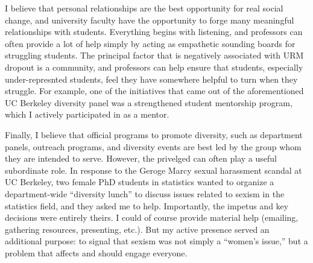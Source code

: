 I believe that personal relationships are the best opportunity for real social
change, and university faculty have the opportunity to forge many meaningful
relationships with students.  Everything begins with listening, and professors
can often provide a lot of help simply by acting as empathetic sounding boards
for struggling students.  The principal factor that is negatively associated
with URM dropout is a community, and professors can help ensure that students,
especially under-represnted students, feel they have somewhere helpful to turn
when they struggle.  For example, one of the initiatives that came out of the
aforementioned UC Berkeley diversity panel was a strengthened student mentorship
program, which I actively participated in as a mentor.

Finally, I believe that official programs to promote diversity, such as
department panels, outreach programs, and diversity events are best led by the
group whom they are intended to serve.  However, the privelged can often play a
useful subordinate role.  In response to the Geroge Marcy sexual harassment
scandal at UC Berkeley, two female PhD students in statistics wanted to organize
a department-wide ``diversity lunch'' to discuss issues related to sexism in the
statistics field, and they asked me to help.  Importantly, the impetus and key
decisions were entirely theirs.  I could of course provide material help
(emailing, gathering resources, presenting, etc.). But my active presence served
an additional purpose: to signal that sexism was not simply a ``women's issue,''
but a problem that affects and should engage everyone.



